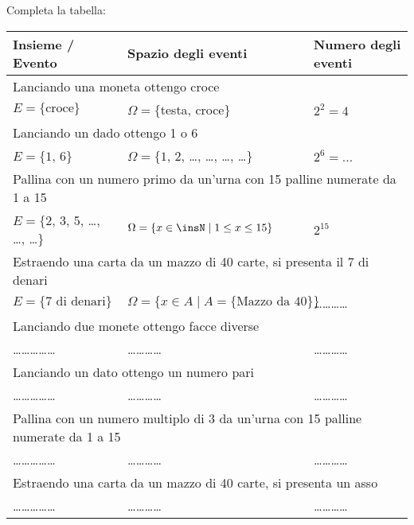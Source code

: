 \begin{esercizio}
 \label{ese:9.3}
Completa la tabella:
\begin{center}
\begin{tabular}{lll}
Insieme / Evento & Spazio degli eventi & Numero degli eventi\\
\midrule
\multicolumn{3}{l}{Lanciando una moneta ottengo croce}\\
$E=\{\text{croce}\} $ & $ \Omega =\{$testa, croce$\} $ & $ 2^2=4 $\\
\midrule
\multicolumn{3}{l}{Lanciando un dado ottengo 1 o 6} \\
$E=\{1$, $6\}$ & $\Omega =\{1$, 2, \ldots, \ldots, \ldots, \ldots$\}$ & $ 2^6=\ldots$\\
\midrule
\multicolumn{3}{l}{Pallina con un numero primo da un'urna con 15 palline numerate da 1 a 15}\\
$E=\{2$, 3, 5, \ldots, \ldots, \ldots$\}$ & $\Omega=\{x\in \insN \mid 1\le x\le 15\}$ & $2^{15}$\\
\midrule
\multicolumn{3}{l}{Estraendo una carta da un mazzo di 40 carte, si presenta il 7 di denari}\\
$ E=\{7\text{ di denari}\} $ & $ \Omega =\{x\in A\mid A=\{\text{Mazzo da 40}\}\} $ & \ldots\ldots\ldots\ldots\\
\midrule
\multicolumn{3}{l}{Lanciando due monete ottengo facce diverse}\\
\ldots \ldots \ldots \ldots \ldots & \ldots \ldots \ldots \ldots & \ldots \ldots \ldots \ldots\\
\midrule
\multicolumn{3}{l}{Lanciando un dato ottengo un numero pari}\\
\ldots \ldots \ldots \ldots \ldots & \ldots \ldots \ldots \ldots & \ldots \ldots \ldots \ldots\\
\midrule
\multicolumn{3}{l}{Pallina con un numero multiplo di 3 da un'urna con 15 palline numerate da 1 a 15}\\
\ldots \ldots \ldots \ldots \ldots & \ldots \ldots \ldots \ldots & \ldots \ldots \ldots \ldots\\
\midrule
\multicolumn{3}{l}{Estraendo una carta da un mazzo di 40 carte, si presenta un asso}\\
\ldots \ldots \ldots \ldots \ldots & \ldots \ldots \ldots \ldots & \ldots \ldots \ldots \ldots\\
\end{tabular}
\end{center}
\end{esercizio}
\pagebreak
